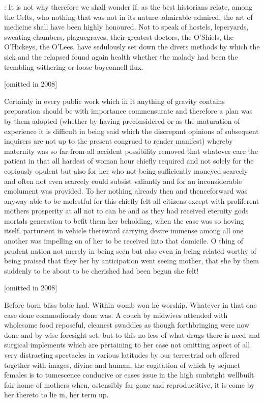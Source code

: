 
: It is not why therefore we shall wonder if, as the best historians
relate, among the Celts, who nothing that was not in its nature admirable
admired, the art of medicine shall have been highly honoured. Not to speak
of hostels, leperyards, sweating chambers, plaguegraves, their greatest
doctors, the O'Shiels, the O'Hickeys, the O'Lees, have sedulously set down
the divers methods by which the sick and the relapsed found again health
whether the malady had been the trembling withering or loose boyconnell
flux.

[omitted in 2008]

Certainly in every public work which in it anything of gravity contains
preparation should be with importance commensurate and therefore a plan
was by them adopted (whether by having preconsidered or as the
maturation of experience it is difficult in being said which the
discrepant opinions of subsequent inquirers are not up to the present
congrued to render manifest) whereby maternity was so far from all
accident possibility removed that whatever care the patient in that all
hardest of woman hour chiefly required and not solely for the copiously
opulent but also for her who not being sufficiently moneyed scarcely and
often not even scarcely could subsist valiantly and for an
inconsiderable emolument was provided. To her nothing already then and
thenceforward was anyway able to be molestful for this chiefly felt all
citizens except with proliferent mothers prosperity at all not to can be
and as they had received eternity gods mortals generation to befit them
her beholding, when the case was so hoving itself, parturient in vehicle
thereward carrying desire immense among all one another was impelling on
of her to be received into that domicile. O thing of prudent nation not
merely in being seen but also even in being related worthy of being
praised that they her by anticipation went seeing mother, that she by
them suddenly to be about to be cherished had been begun she felt!



[omitted in 2008]

Before born bliss babe had. Within womb won he worship. Whatever
in that one case done commodiously done was. A couch by midwives
attended with wholesome food reposeful, cleanest swaddles as though
forthbringing were now done and by wise foresight set: but to this no less
of what drugs there is need and surgical implements which are pertaining
to her case not omitting aspect of all very distracting spectacles in
various latitudes by our terrestrial orb offered together with images,
divine and human, the cogitation of which by sejunct females is to
tumescence conducive or eases issue in the high sunbright wellbuilt fair
home of mothers when, ostensibly far gone and reproductitive, it is come
by her thereto to lie in, her term up.

